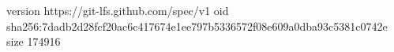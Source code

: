 version https://git-lfs.github.com/spec/v1
oid sha256:7dadb2d28fcf20ac6c417674e1ee797b5336572f08e609a0dba93c5381c0742e
size 174916
